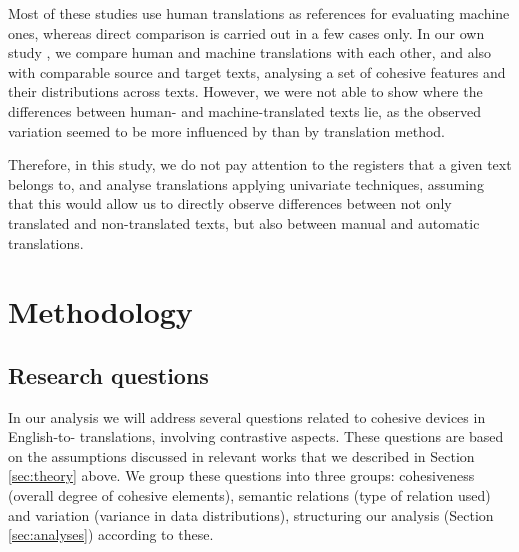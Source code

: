 \documentclass[output=paper]{langsci/langscibook.cls}
\begin{document}
Most of these studies use human translations as references for evaluating machine ones, whereas direct comparison is carried out in a few cases only. In our own study \citep{Lapshinova2015Disco}, we compare human and machine translations with each other, and also with comparable source and target texts, analysing a set of cohesive features and their distributions across texts. However, we were not able to show where the differences between human- and machine-translated texts lie, as the observed variation seemed to be more influenced by  than by translation method.

Therefore, in this study, we do not pay attention to the registers that a given text belongs to, and analyse translations applying univariate techniques, assuming that this would allow us to directly observe differences between not only translated and non-translated texts, but also between manual and automatic translations.



\section{Methodology}\label{sec:methodology}
\subsection{Research questions}\label{sec:researchquestions}
In our analysis we will address several questions related to cohesive devices in English-to- translations, involving contrastive aspects. These questions are based on the assumptions discussed in relevant works that we described in Section \ref{sec:theory} above. We group these questions into three groups: cohesiveness (overall degree of cohesive elements), semantic relations (type of relation used) and variation (variance in data distributions), structuring our analysis (Section \ref{sec:analyses}) according to these. 
\end{document}

